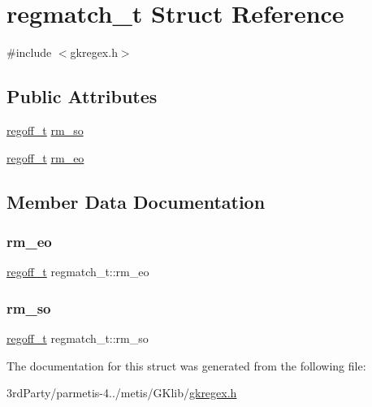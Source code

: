 \hypertarget{structregmatch__t}{}\section{regmatch\+\_\+t Struct Reference}
\label{structregmatch__t}


{\ttfamily \#include $<$gkregex.\+h$>$}

\subsection*{Public Attributes}
\begin{DoxyCompactItemize}
\item 
\hyperlink{gkregex_8h_a5b34995b47432512ee4ffa32b836e65f}{regoff\+\_\+t} \hyperlink{structregmatch__t_a90ac8973d256eaffdbb20de676ff45a4}{rm\+\_\+so}
\item 
\hyperlink{gkregex_8h_a5b34995b47432512ee4ffa32b836e65f}{regoff\+\_\+t} \hyperlink{structregmatch__t_a728c28b9b23fa28c4e0b90e3a1a29efc}{rm\+\_\+eo}
\end{DoxyCompactItemize}


\subsection{Member Data Documentation}
\mbox{\label{structregmatch__t_a728c28b9b23fa28c4e0b90e3a1a29efc}} 
\subsubsection{\texorpdfstring{rm\+\_\+eo}{rm\_eo}}
{\footnotesize\ttfamily \hyperlink{gkregex_8h_a5b34995b47432512ee4ffa32b836e65f}{regoff\+\_\+t} regmatch\+\_\+t\+::rm\+\_\+eo}

\mbox{\label{structregmatch__t_a90ac8973d256eaffdbb20de676ff45a4}} 
\subsubsection{\texorpdfstring{rm\+\_\+so}{rm\_so}}
{\footnotesize\ttfamily \hyperlink{gkregex_8h_a5b34995b47432512ee4ffa32b836e65f}{regoff\+\_\+t} regmatch\+\_\+t\+::rm\+\_\+so}



The documentation for this struct was generated from the following file\+:\begin{DoxyCompactItemize}
\item 
3rd\+Party/parmetis-\/4../metis/\+G\+Klib/\hyperlink{gkregex_8h}{gkregex.\+h}\end{DoxyCompactItemize}
